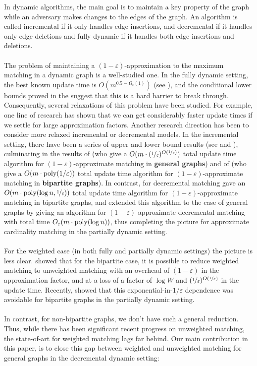 \documentclass[a4paper,11pt]{article}
\newcommand{\poly}{\mbox{\rm poly}}
\newcommand{\eps}{\varepsilon}
\theoremstyle{definition}
\theoremstyle{definition}
\theoremstyle{definition}
\theoremstyle{definition}
\theoremstyle{definition}
\theoremstyle{definition}
\theoremstyle{definition}
\theoremstyle{definition}
\theoremstyle{definition}
\theoremstyle{definition}
\theoremstyle{definition}
\theoremstyle{definition}
\theoremstyle{definition}
\theoremstyle{definition}
\theoremstyle{definition}
\begin{document}
In dynamic algorithms, the main goal is to maintain a key property of the graph while an adversary makes changes to the edges of the graph. An algorithm is called incremental if it only handles edge insertions, and decremental if it handles only edge deletions and fully dynamic if it handles both edge insertions and deletions. \\ \\
The problem of maintaining a $(1-\eps)$-approximation to the maximum matching in a dynamic graph is a well-studied one. In the fully dynamic setting, the best known update time is $O(m^{0.5-\Omega_{\eps}(1)})$ (see \cite{BKS23}), and the conditional lower bounds proved in the \cite{HKNS15,KPP16} suggest that this is a hard barrier to break through. Consequently, several relaxations of this problem have been studied. For example, one line of research has shown that we can get considerably faster update times if we settle for large approximation factors. Another research direction has been to consider more relaxed incremental or decremental models. In the incremental setting, there have been a series of upper and lower bound results (see \cite{Dahlgaard16} and \cite{Gupta2014}), culminating in the results of \cite{GLSSS19} (who give a $O(m\cdot (\nicefrac{1}{\eps})^{O(\nicefrac{1}{\eps})})$ total update time algorithm for $(1-\eps)$-approximate matching in \textbf{general graphs}) and of \cite{BlikstadK23} (who give a $O(m\cdot \poly(1/\eps))$ total update time algorithm for $(1-\eps)$-approximate matching in \textbf{bipartite graphs}). In contrast, for decremental matching \cite{BPT20,JambulapatiJST22} gave an $O(m\cdot\poly(\log n,\nicefrac{1}{\eps}))$ total update time algorithm for $(1-\eps)$-approximate matching in bipartite graphs, and \cite{AssadiBD22} extended this algorithm to the case of general graphs by giving an algorithm for $(1-\eps)$-approximate decremental matching with total time $O_{\eps}(m\cdot \poly(\log n))$, thus completing the picture for approximate cardinality matching in the partially dynamic setting. \\ \\
For the weighted case (in both fully and partially dynamic settings) the picture is less clear. \cite{BernsteinDL21} showed that for the bipartite case, it is possible to reduce weighted matching to unweighted matching with an overhead of $(1-\eps)$ in the approximation factor, and at a loss of a factor of $\log W$ and $(\nicefrac{1}{\eps})^{O(\nicefrac{1}{\eps})}$ in the update time. Recently, \cite{BhattacharyaKS23b} showed that this exponential-in-$1/\eps$ dependence was avoidable for bipartite graphs in the partially dynamic setting. \\ \\
In contrast, for non-bipartite graphs, we don’t have such a general reduction. Thus, while there has been significant recent progress on unweighted matching, the state-of-art for weighted matching lags far behind. Our main contribution in this paper, is to close this gap between weighted and unweighted matching for general graphs in the decremental dynamic setting:
\end{document}
